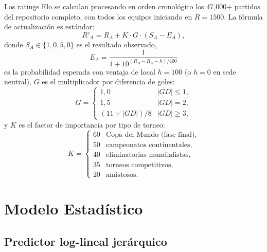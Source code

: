 \documentclass[12pt,a4paper]{article}
\begin{document}
Los ratings Elo se calculan procesando en orden cronológico los 47{,}000+
partidos del repositorio completo, con todos los equipos iniciando en
$R = 1500$. La fórmula de actualización es estándar:
\begin{equation}
  R'_A = R_A + K \cdot G \cdot (S_A - E_A),
  \label{eq:elo-update}
\end{equation}
donde $S_A \in \{1, 0{,}5, 0\}$ es el resultado observado,
\begin{equation}
  E_A = \frac{1}{1 + 10^{(R_B - R_A - h)/400}}
  \label{eq:elo-expected}
\end{equation}
es la probabilidad esperada con ventaja de local $h = 100$ (o $h = 0$ en
sede neutral), $G$ es el multiplicador por diferencia de goles:
\begin{equation}
  G = \begin{cases}
    1{,}0 & |GD| \leq 1, \\
    1{,}5 & |GD| = 2, \\
    (11 + |GD|) / 8 & |GD| \geq 3,
  \end{cases}
  \label{eq:elo-g}
\end{equation}
y $K$ es el factor de importancia por tipo de torneo:
\begin{equation}
  K = \begin{cases}
    60 & \text{Copa del Mundo (fase final),} \\
    50 & \text{campeonatos continentales,} \\
    40 & \text{eliminatorias mundialistas,} \\
    35 & \text{torneos competitivos,} \\
    20 & \text{amistosos.}
  \end{cases}
  \label{eq:elo-k}
\end{equation}

\section{Modelo Estadístico}
\label{sec:model}

\subsection{Predictor log-lineal jerárquico}
\end{document}
